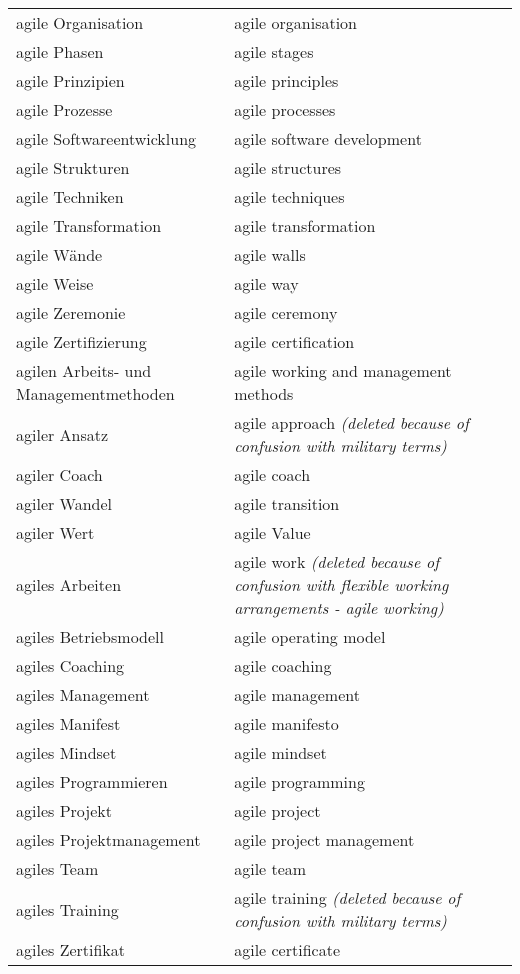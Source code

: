 \begin{spacing}{.5}
\begin{longtable}{ p{} p{}}
    agile Organisation & agile organisation \\
    agile Phasen & agile stages \\
    agile Prinzipien & agile principles \\
    agile Prozesse & agile processes \\
    agile Softwareentwicklung & agile software development \\
    agile Strukturen & agile structures \\
    agile Techniken & agile techniques \\
    agile Transformation & agile transformation \\
    agile Wände & agile walls \\
    agile Weise & agile way \\
    agile Zeremonie & agile ceremony \\
    agile Zertifizierung & agile certification \\
    agilen Arbeits- und Managementmethoden & agile working and management methods \\
    agiler Ansatz & agile approach \textit{(deleted because of confusion with military terms)} \\
    agiler Coach & agile coach \\
    agiler Wandel & agile transition \\
    agiler Wert & agile Value \\
    agiles Arbeiten & agile work \textit{(deleted because of confusion with flexible working arrangements - agile working)} \\
    agiles Betriebsmodell & agile operating model \\
    agiles Coaching & agile coaching \\
    agiles Management & agile management \\
    agiles Manifest & agile manifesto \\
    agiles Mindset & agile mindset \\
    agiles Programmieren & agile programming \\
    agiles Projekt & agile project \\
    agiles Projektmanagement & agile project management \\
    agiles Team & agile team \\
    agiles Training & agile training \textit{(deleted because of confusion with military terms)} \\
    agiles Zertifikat & agile certificate \\

\end{longtable}
\end{spacing}
